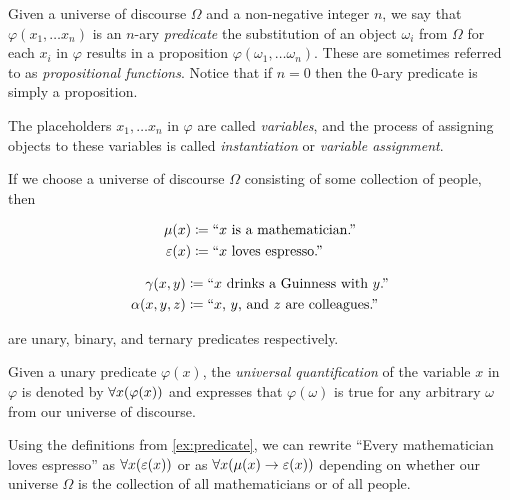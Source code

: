 \begin{definition}[Predicate]
    Given a universe of discourse $\Omega$ and a non-negative integer $n$,
    we say that $\varphi(x_1, \dots x_n)$ is an $n$-ary \emph{predicate}
    \iffbydefn the substitution of an object $\omega_i$ from $\Omega$ for each $x_i$ in $\varphi$
    results in a proposition $\varphi(\omega_1, \dots \omega_n)$.
    These are sometimes referred to as \emph{propositional functions}.
    Notice that if $n = 0$ then the $0$-ary predicate is simply a proposition.

    The placeholders $x_1, \dots x_n$ in $\varphi$ are called \emph{variables},
    and the process of assigning objects to these variables is called
    \emph{instantiation} or \emph{variable assignment}.
\end{definition}
\begin{example}\label{ex:predicate}
    If we choose a universe of discourse $\Omega$ consisting of some collection of people, then

    \begin{minipage}{.45\linewidth}
        \vspace{-\parskip-\abovedisplayskip}
        \begin{align*}
            \mu(x) &\coloneqq \text{``}x \text{ is a mathematician.''}\\
            \varepsilon(x) &\coloneqq \text{``}x \text{ loves espresso.''}
        \end{align*}
    \end{minipage}%
    \begin{minipage}{.45\linewidth}
        \vspace{-\parskip-\abovedisplayskip}
        \begin{align*}
            \gamma(x, y) &\coloneqq \text{``}x \text{ drinks a Guinness with } y\text{.''}\\
            \alpha(x, y, z) &\coloneqq \text{``}x\text{, }y\text{, and } z \text{ are colleagues.''}
        \end{align*}
    \end{minipage}

    are unary, binary, and ternary predicates respectively.
\end{example}

\begin{definition}
    Given a unary predicate $\varphi(x)$,
    the \emph{universal quantification} of the variable $x$ in $\varphi$
    is denoted by $\forall x \pn*{\varphi(x)}$
    and expresses that $\varphi(\omega)$ is true for any arbitrary $\omega$ from our universe of discourse.
\end{definition}
\begin{example}
    Using the definitions from \autoref{ex:predicate},
    we can rewrite ``Every mathematician loves espresso'' as
    $\forall x \pn*{\varepsilon(x)}$ or as $\forall x \pn*{\mu(x) \rightarrow \varepsilon(x)}$
    depending on whether our universe $\Omega$
    is the collection of all mathematicians or of all people.
\end{example}

